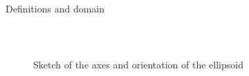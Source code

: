 \documentclass[10pt]{beamer}
\begin{document}
\begin{frame}{Definitions and domain}
\begin{columns}
    \begin{column}{.4\textwidth}
      \begin{figure}
        \centering
         \\
        \caption{Sketch of the axes and orientation of the ellipsoid}
        \label{fig:orient-sketch}
      \end{figure}
    \end{column}
  \end{columns}
\end{frame}
\end{document}

